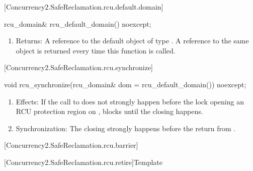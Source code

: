 [Concurrency2.SafeReclamation.rcu.default.domain]{}

\begin{codeblock}
   rcu_domain& rcu_default_domain() noexcept;
\end{codeblock}

\begin{enumerate}
\item	Returns: A reference to the default object of type .
	A reference to the same object is returned every time this
	function is called.
\end{enumerate}

[Concurrency2.SafeReclamation.rcu.synchronize]{}

\begin{codeblock}
   void rcu_synchronize(rcu_domain& dom = rcu_default_domain()) noexcept;
\end{codeblock}

\begin{enumerate}
\item	Effects: If the call to  does not strongly
	happen before the lock opening an RCU protection region 
	on , blocks until the  closing 
	happens.
\item	Synchronization: The  closing  strongly
	happens before the return from .
\end{enumerate}

[Concurrency2.SafeReclamation.rcu.barrier]{}

[Concurrency2.SafeReclamation.rcu.retire]{Template }
